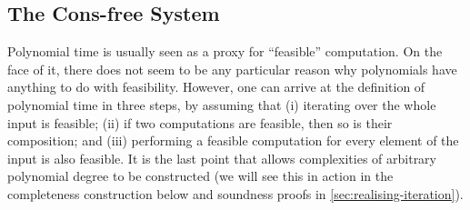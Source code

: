 \documentclass[acmsmall,screen]{acmart}
\begin{document}
\subsection{The Cons-free System}
\label{sec:cons-free-intro}

Polynomial time is usually seen as a proxy for ``feasible''
computation. On the face of it, there does not seem to be any
particular reason why polynomials have anything to do with
feasibility. However, one can arrive at the definition of polynomial
time in three steps, by assuming that (i) iterating over the whole
input is feasible; (ii) if two computations are feasible, then so is
their composition; and (iii) performing a feasible computation for
every element of the input is also feasible. It is the last point that
allows complexities of arbitrary polynomial degree to be constructed
(we will see this in action in the completeness construction below and
soundness proofs in \autoref{sec:realising-iteration}).
\end{document}
